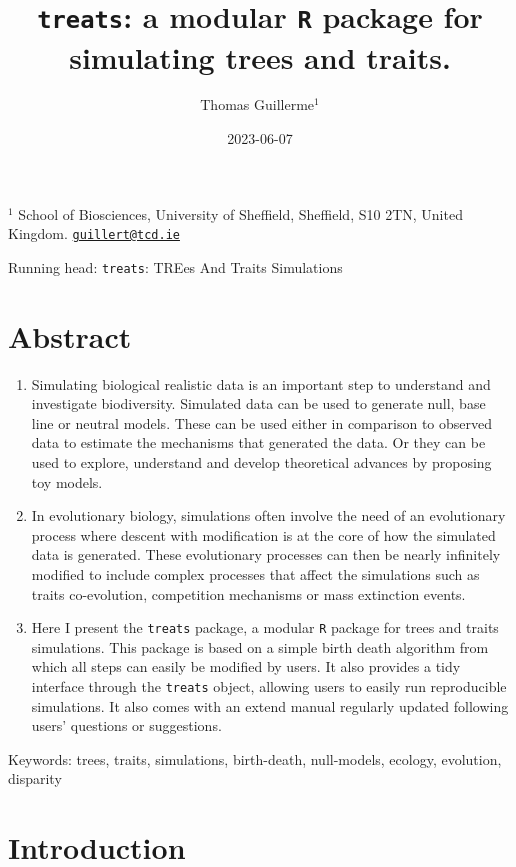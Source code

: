 \documentclass[
]{article}
\title{\texttt{treats}: a modular \texttt{R} package for simulating
trees and traits.}
\author{Thomas Guillerme\(^1\)}
\date{2023-06-07}
\begin{document}
\maketitle

\(^1\) School of Biosciences, University of Sheffield, Sheffield, S10
2TN, United Kingdom.
\href{mailto:guillert@tcd.ie}{\nolinkurl{guillert@tcd.ie}}

Running head: \texttt{treats}: TREes And Traits Simulations

\hypertarget{abstract}{%
\section{Abstract}\label{abstract}}

\begin{enumerate}
\def\labelenumi{\arabic{enumi}.}
\item
  Simulating biological realistic data is an important step to
  understand and investigate biodiversity. Simulated data can be used to
  generate null, base line or neutral models. These can be used either
  in comparison to observed data to estimate the mechanisms that
  generated the data. Or they can be used to explore, understand and
  develop theoretical advances by proposing toy models.
\item
  In evolutionary biology, simulations often involve the need of an
  evolutionary process where descent with modification is at the core of
  how the simulated data is generated. These evolutionary processes can
  then be nearly infinitely modified to include complex processes that
  affect the simulations such as traits co-evolution, competition
  mechanisms or mass extinction events.
\item
  Here I present the \texttt{treats} package, a modular \texttt{R}
  package for trees and traits simulations. This package is based on a
  simple birth death algorithm from which all steps can easily be
  modified by users. It also provides a tidy interface through the
  \texttt{treats} object, allowing users to easily run reproducible
  simulations. It also comes with an extend manual regularly updated
  following users' questions or suggestions.
\end{enumerate}

Keywords: trees, traits, simulations, birth-death, null-models, ecology,
evolution, disparity

\hypertarget{introduction}{%
\section{Introduction}\label{introduction}}
\end{document}
